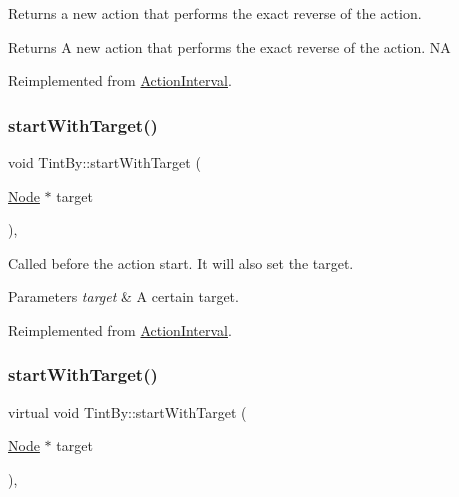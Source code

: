 Returns a new action that performs the exact reverse of the action.

\begin{DoxyReturn}{Returns}
A new action that performs the exact reverse of the action.  NA 
\end{DoxyReturn}


Reimplemented from \hyperlink{classActionInterval_a9f9ac7164036a0bc261a72f62a2b2da7}{Action\+Interval}.

\mbox{\label{classTintBy_a7fd302e5928e7ffbfe6f42cffc931990}} 
\subsubsection{\texorpdfstring{start\+With\+Target()}{startWithTarget()}\hspace{0.1cm}{\footnotesize\ttfamily [1/2]}}
{\footnotesize\ttfamily void Tint\+By\+::start\+With\+Target (\begin{DoxyParamCaption}\item[{\hyperlink{classNode}{Node} $\ast$}]{target }\end{DoxyParamCaption})\hspace{0.3cm}{\ttfamily [override]}, {\ttfamily [virtual]}}

Called before the action start. It will also set the target.


\begin{DoxyParams}{Parameters}
{\em target} & A certain target. \\
\hline
\end{DoxyParams}


Reimplemented from \hyperlink{classActionInterval_ad3d91186b2c3108488ddbbdbbd982484}{Action\+Interval}.

\mbox{\label{classTintBy_a51b72cc71384a7a7dc3e47ecb71e9d44}} 
\subsubsection{\texorpdfstring{start\+With\+Target()}{startWithTarget()}\hspace{0.1cm}{\footnotesize\ttfamily [2/2]}}
{\footnotesize\ttfamily virtual void Tint\+By\+::start\+With\+Target (\begin{DoxyParamCaption}\item[{\hyperlink{classNode}{Node} $\ast$}]{target }\end{DoxyParamCaption})\hspace{0.3cm}{\ttfamily [override]}, {\ttfamily [virtual]}}

